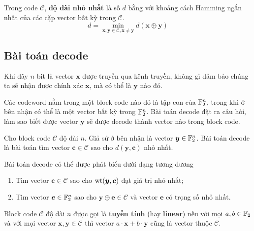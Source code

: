 \begin{definition}
    Trong code $\mathcal{C}$, \textbf{độ dài nhỏ nhất} là số $d$ bằng với khoảng cách Hamming ngắn nhất của các cặp vector bất kỳ trong $\mathcal{C}$.
    \begin{equation*}
        d = \min_{\bm{x}, \bm{y} \in \mathcal{C}, \bm{x} \neq \bm{y}} d(\bm{x} \oplus \bm{y})
    \end{equation*}
\end{definition}

\subsection*{Bài toán decode}

Khi dãy $n$ bit là vector $\bm{x}$ được truyền qua kênh truyền, không gì đảm bảo chúng ta sẽ nhận được chính xác $\bm{x}$, mà có thể là $\bm{y}$ nào đó.

Các codeword nằm trong một block code nào đó là tập con của $\mathbb{F}_2^n$, trong khi ở bên nhận có thể là một vector bất kỳ trong $\mathbb{F}_2^n$. Bài toán decode đặt ra câu hỏi, làm sao biết được vector $\bm{y}$ sẽ được decode thành vector nào trong block code.

\begin{definition}
    Cho block code $\mathcal{C}$ độ dài $n$. Giả sử ở bên nhận là vector $\bm{y} \in \mathbb{F}_2^n$. Bài toán decode là bài toán tìm vector $\bm{c} \in \mathcal{C}$ sao cho $d(\bm{y}, \bm{c})$ nhỏ nhất.
\end{definition}

Bài toán decode có thể được phát biểu dưới dạng tương đương

\begin{enumerate}
    \item Tìm vector $\bm{c} \in \mathcal{C}$ sao cho $\operatorname{wt}(\bm{y}, \bm{c})$ đạt giá trị nhỏ nhất;
    \item Tìm vector $\bm{e} \in \mathbb{F}_2^n$ sao cho $\bm{y} \oplus \bm{e} \in \mathcal{C}$ và vector $\bm{e}$ có trọng số nhỏ nhất.
\end{enumerate}

\begin{definition}
    Block code $\mathcal{C}$ độ dài $n$ được gọi là \textbf{tuyến tính} (hay \textbf{linear}) nếu với mọi $a, b \in \mathbb{F}_2$ và với mọi vector $\bm{x}, \bm{y} \in \mathcal{C}$ thì vector $a \cdot \bm{x} + b \cdot \bm{y}$ cũng là vector thuộc $\mathcal{C}$.
\end{definition}

